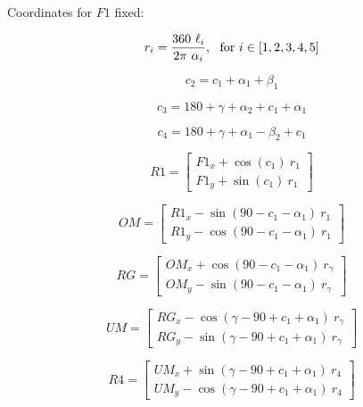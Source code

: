 \documentclass[10pt,a4paper]{article}
\begin{document}
\clearpage
\begin{multicols}{2}

Coordinates for $F1$ fixed:

\begin{equation}
r_i = \frac{360 ~ \ell_i}{2 \pi ~ \alpha_i},~~ \textnormal{for}~ i \in [1,2,3,4,5]
\end{equation}

\begin{equation}
c_2 = c_1 + \alpha_1 + \beta_1
\label{eq:F1_start}
\end{equation}

\begin{equation}
c_3 = 180 + \gamma + \alpha_2 + c_1 + \alpha_1
\end{equation}

\begin{equation}
c_4 = 180 + \gamma + \alpha_1 - \beta_2 + c_1
\end{equation}


\begin{equation}
R1 =  \begin{bmatrix} 
F1_x +\cos(c_1)~r_1 \\ 
F1_y + \sin(c_1)~r_1\end{bmatrix}
\end{equation}

\begin{equation}
OM =  \begin{bmatrix} 
R1_x - \sin(90-c_1-\alpha_1)~r_1 \\ 
R1_y - \cos(90-c_1-\alpha_1)~r_1 \end{bmatrix}
\end{equation}

\begin{equation}
RG =  \begin{bmatrix} 
OM_x + \cos(90-c_1-\alpha_1)~r_\gamma \\ 
OM_y - \sin(90-c_1-\alpha_1)~r_\gamma \end{bmatrix}
\end{equation}

\begin{equation}
UM =  \begin{bmatrix} 
RG_x - \cos(\gamma - 90 + c_1 + \alpha_1)~r_\gamma \\ 
RG_y - \sin(\gamma - 90 + c_1 + \alpha_1)~r_\gamma \end{bmatrix}
\end{equation}

\begin{equation}
R4 =  \begin{bmatrix} 
UM_x + \sin(\gamma - 90 + c_1 + \alpha_1)~r_4 \\
UM_y - \cos(\gamma - 90 + c_1 + \alpha_1)~r_4 \end{bmatrix}
\end{equation}


\end{multicols}
\end{document}
